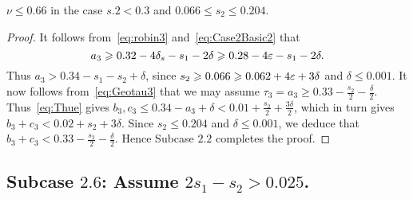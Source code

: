 \begin{lemma}\label{lem:Subcase2.5}
  \leanok
  $\nu \leq 0.66$ in the case $s.2 < 0.3$ and $0.066\leq s_2\leq 0.204$.
\end{lemma}
\begin{proof}
  \leanok
  It follows from~\eqref{eq:robin3} and~\eqref{eq:Case2Basic2} that
  \[
  a_3 \geqslant 0.32-4\delta_s-s_1 -2\delta \geqslant 0.28-4\varepsilon-s_1 -2\delta.
  \]
  Thus
  $a_3>0.34-s_1-s_2 +\delta$, since $s_2\geqslant 0.066 \geqslant 0.062+4\varepsilon +3\delta$ and $\delta\leq 0.001$.
  It now follows from~\eqref{eq:Geotau3} that we may assume $\tau_3=a_3 \geq 0.33
  -\frac{s_2}{2}-
  \frac{\delta}{2}$.
  Thus~\eqref{eq:Thue} gives
  $b_3,c_3 \le 0.34-a_3 +\delta< 0.01 +\frac{s_2}{2}+ \frac{3\delta}{2}$, which in turn gives
  $b_3+c_3 < 0.02+s_2 +3\delta$.
  Since $s_2\leq 0.204$ and $\delta\leq 0.001$, we deduce that
  $b_3+c_3<0.33-\frac{s_2}{2}-\frac{\delta}{2}$. Hence
  Subcase $\mathbf{2.2}$ completes the proof.
\end{proof}


\subsection*{Subcase $\mathbf{2.6}$: Assume $2s_1-s_2>0.025$.}

